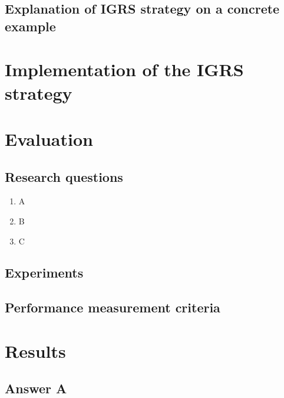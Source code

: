 

\subsection{Explanation of IGRS strategy on a concrete example}



\section{Implementation of the IGRS strategy}\label{sec:imp}




\section{Evaluation}\label{sec:eval}

\subsection{Research questions}
\begin{enumerate}
\item A
\item B
\item C
\end{enumerate}



\subsection{Experiments}


\subsection{Performance measurement criteria}

\section{Results}\label{sec:res}

\subsection{Answer A}

